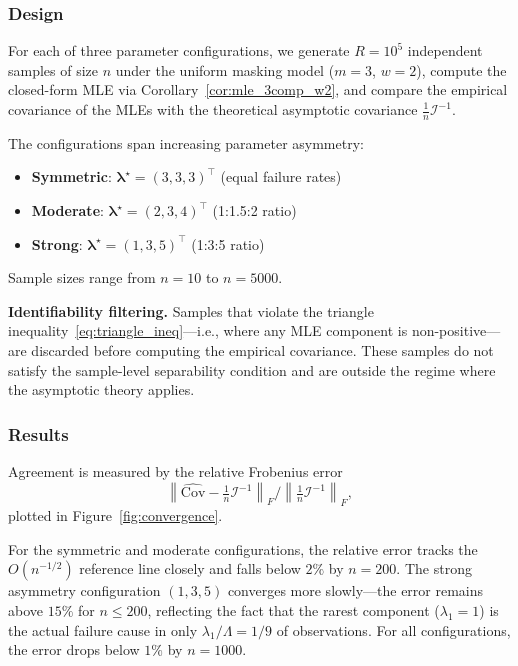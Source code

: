\documentclass[pdflatex,sn-mathphys-num,Numbered]{sn-jnl}
\newcommand{\tparam}[1]{{#1}^{\star}}  %
\newcommand{\infomatrx}{\mathcal{I}}
\renewcommand{\vec}[1]{\boldsymbol{#1}}
\theoremstyle{thmstyleone}
\theoremstyle{thmstylethree}
\theoremstyle{thmstyletwo}
\begin{document}
\subsubsection{Design}

For each of three parameter configurations, we generate $R = 10^5$ independent samples of size $n$ under the uniform masking model ($m=3$, $w=2$), compute the closed-form MLE via Corollary~\ref{cor:mle_3comp_w2}, and compare the empirical covariance of the MLEs with the theoretical asymptotic covariance $\frac{1}{n}\infomatrx^{-1}$.

The configurations span increasing parameter asymmetry:
\begin{itemize}
\item \textbf{Symmetric}: $\tparam{\vec{\lambda}} = (3, 3, 3)^\top$ (equal failure rates)
\item \textbf{Moderate}: $\tparam{\vec{\lambda}} = (2, 3, 4)^\top$ (1:1.5:2 ratio)
\item \textbf{Strong}: $\tparam{\vec{\lambda}} = (1, 3, 5)^\top$ (1:3:5 ratio)
\end{itemize}
Sample sizes range from $n = 10$ to $n = 5000$.

\textbf{Identifiability filtering.} Samples that violate the triangle inequality~\eqref{eq:triangle_ineq}---i.e., where any MLE component is non-positive---are discarded before computing the empirical covariance. These samples do not satisfy the sample-level separability condition and are outside the regime where the asymptotic theory applies.

\subsubsection{Results}

Agreement is measured by the relative Frobenius error
\begin{equation*}
\left\|\widehat{\mathrm{Cov}} - \tfrac{1}{n}\infomatrx^{-1}\right\|_F \Big/ \left\|\tfrac{1}{n}\infomatrx^{-1}\right\|_F,
\end{equation*}
plotted in Figure~\ref{fig:convergence}.

For the symmetric and moderate configurations, the relative error tracks the $O(n^{-1/2})$ reference line closely and falls below $2\%$ by $n = 200$. The strong asymmetry configuration $(1,3,5)$ converges more slowly---the error remains above $15\%$ for $n \leq 200$, reflecting the fact that the rarest component ($\lambda_1 = 1$) is the actual failure cause in only $\lambda_1/\Lambda = 1/9$ of observations. For all configurations, the error drops below $1\%$ by $n = 1000$.
\end{document}
